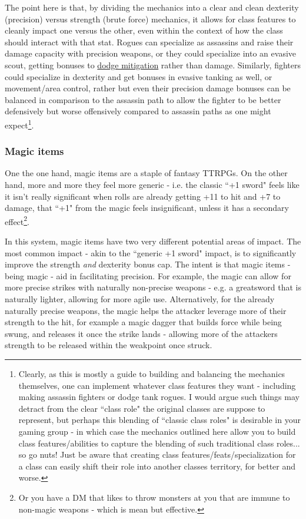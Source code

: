 \documentclass{article}
\begin{document}
            The point here is that, by dividing the mechanics into a clear and clean dexterity (precision) versus strength (brute force) mechanics, it allows for class features to cleanly impact one versus the other, even within the context of how the class should interact with that stat. Rogues can specialize as assassins and raise their damage capacity with precision weapons, or they could specialize into an evasive scout, getting bonuses to \hyperref[subsec:dodge]{dodge mitigation} rather than damage. Similarly, fighters could specialize in dexterity and get bonuses in evasive tanking as well, or movement/area control, rather but even their precision damage bonuses can be balanced in comparison to the assassin path to allow the fighter to be better defensively but worse offensively compared to assassin paths as one might expect\footnote{Clearly, as this is mostly a guide to building and balancing the mechanics themselves, one can implement whatever class features they want - including making assassin fighters or dodge tank rogues. I would argue such things may detract from the clear ``class role" the original classes are suppose to represent, but perhaps this blending of ``classic class roles" is desirable in your gaming group - in which case the mechanics outlined here allow you to build class features/abilities to capture the blending of such traditional class roles... so go nuts! Just be aware that creating class features/feats/specialization for a class can easily shift their role into another classes territory, for better and worse.}.
        
        
        \subsubsection{Magic items}
            One the one hand, magic items are a staple of fantasy TTRPGs. On the other hand, more and more they feel more generic - i.e. the classic ``+1 sword" feels like it isn't really significant when rolls are already getting +11 to hit and +7 to damage, that ``+1" from the magic feels insignificant, unless it has a secondary effect\footnote{Or you have a DM that likes to throw monsters at you that are immune to non-magic weapons - which is mean but effective.}.
            
            In this system, magic items have two very different potential areas of impact. The most common impact - akin to the ``generic +1 sword" impact, is to significantly improve the strength \emph{and} dexterity bonus cap. The intent is that magic items - being magic - aid in facilitating precision. For example, the magic can allow for more precise strikes with naturally non-precise weapons - e.g. a greatsword that is naturally lighter, allowing for more agile use. Alternatively, for the already naturally precise weapons, the magic helps the attacker leverage more of their strength to the hit, for example a magic dagger that builds force while being swung, and releases it once the strike lands - allowing more of the attackers strength to be released within the weakpoint once struck. 
            
\end{document}
